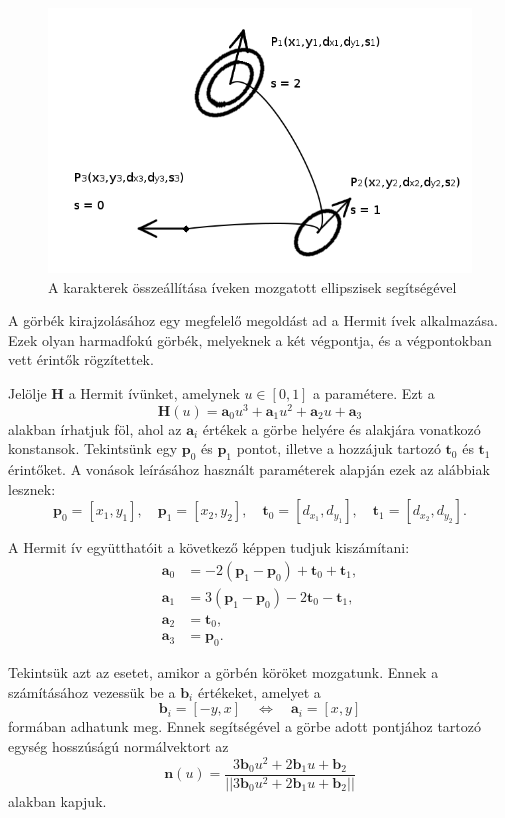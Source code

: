 \begin{enumerate}
\begin{figure}
\centering
\includegraphics[scale=0.5]{images/proc_draw2}
\caption{A karakterek összeállítása íveken mozgatott ellipszisek segítségével}
\label{fig:proc_draw2}
\end{figure}

A görbék kirajzolásához egy megfelelő megoldást ad a Hermit ívek alkalmazása. Ezek olyan harmadfokú görbék, melyeknek a két végpontja, és a végpontokban vett érintők rögzítettek.

Jelölje $\textbf{H}$ a Hermit ívünket, amelynek $u \in [0, 1]$ a paramétere. Ezt a
$$
\textbf{H}(u) = \textbf{a}_0 u^3 + \textbf{a}_1 u^2 + \textbf{a}_2 u + \textbf{a}_3
$$
alakban írhatjuk föl, ahol az $\textbf{a}_i$ értékek a görbe helyére és alakjára vonatkozó konstansok. Tekintsünk egy $\textbf{p}_0$ és $\textbf{p}_1$ pontot, illetve a hozzájuk tartozó $\textbf{t}_0$ és $\textbf{t}_1$ érintőket. A vonások leírásához használt paraméterek alapján ezek az alábbiak lesznek:
$$
\textbf{p}_0 = [x_1, y_1], \quad
\textbf{p}_1 = [x_2, y_2], \quad
\textbf{t}_0 = [d_{x_1}, d_{y_1}], \quad
\textbf{t}_1 = [d_{x_2}, d_{y_2}].
$$

A Hermit ív együtthatóit a következő képpen tudjuk kiszámítani:
\begin{align*}
\textbf{a}_0 &= -2(\textbf{p}_1 - \textbf{p}_0) + \textbf{t}_0 + \textbf{t}_1, \\
\textbf{a}_1 &= 3(\textbf{p}_1 - \textbf{p}_0) - 2 \textbf{t}_0 - \textbf{t}_1, \\
\textbf{a}_2 &= \textbf{t}_0, \\
\textbf{a}_3 &= \textbf{p}_0.
\end{align*}

Tekintsük azt az esetet, amikor a görbén köröket mozgatunk. Ennek a számításához vezessük be a $\textbf{b}_i$ értékeket, amelyet a
$$
\textbf{b}_i = [-y, x] \quad \Leftrightarrow \quad \textbf{a}_i = [x, y]
$$
formában adhatunk meg. Ennek segítségével a görbe adott pontjához tartozó egység hosszúságú normálvektort az
$$
\textbf{n}(u) = \dfrac{3 \textbf{b}_0 u^2 + 2 \textbf{b}_1 u + \textbf{b}_2}{
||3 \textbf{b}_0 u^2 + 2 \textbf{b}_1 u + \textbf{b}_2||
}
$$
alakban kapjuk.


\end{enumerate}
